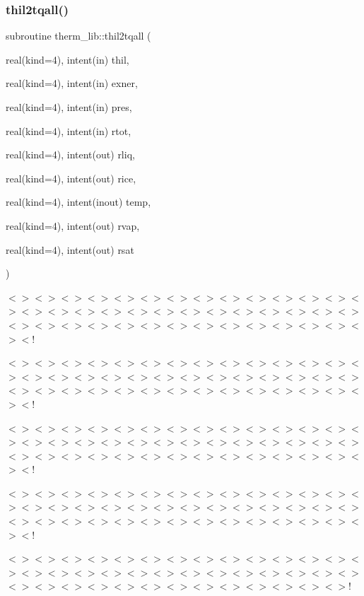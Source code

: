 \subsubsection{\texorpdfstring{thil2tqall()}{thil2tqall()}}
{\footnotesize\ttfamily subroutine therm\+\_\+lib\+::thil2tqall (\begin{DoxyParamCaption}\item[{real(kind=4), intent(in)}]{thil,  }\item[{real(kind=4), intent(in)}]{exner,  }\item[{real(kind=4), intent(in)}]{pres,  }\item[{real(kind=4), intent(in)}]{rtot,  }\item[{real(kind=4), intent(out)}]{rliq,  }\item[{real(kind=4), intent(out)}]{rice,  }\item[{real(kind=4), intent(inout)}]{temp,  }\item[{real(kind=4), intent(out)}]{rvap,  }\item[{real(kind=4), intent(out)}]{rsat }\end{DoxyParamCaption})}

$<$$>$$<$$>$$<$$>$$<$$>$$<$$>$$<$$>$$<$$>$$<$$>$$<$$>$$<$$>$$<$$>$$<$$>$$<$$>$$<$$>$$<$$>$$<$$>$$<$$>$$<$$>$$<$$>$$<$$>$$<$$>$$<$$>$$<$$>$$<$$>$$<$$>$$<$$>$$<$$>$$<$$>$$<$$>$$<$$>$$<$$>$$<$$>$$<$$>$$<$$>$$<$$>$$<$$>$$<$$>$$<$$>$$<$$>$$<$$>$$<$$>$$<$!

$<$$>$$<$$>$$<$$>$$<$$>$$<$$>$$<$$>$$<$$>$$<$$>$$<$$>$$<$$>$$<$$>$$<$$>$$<$$>$$<$$>$$<$$>$$<$$>$$<$$>$$<$$>$$<$$>$$<$$>$$<$$>$$<$$>$$<$$>$$<$$>$$<$$>$$<$$>$$<$$>$$<$$>$$<$$>$$<$$>$$<$$>$$<$$>$$<$$>$$<$$>$$<$$>$$<$$>$$<$$>$$<$$>$$<$$>$$<$$>$$<$$>$$<$!

$<$$>$$<$$>$$<$$>$$<$$>$$<$$>$$<$$>$$<$$>$$<$$>$$<$$>$$<$$>$$<$$>$$<$$>$$<$$>$$<$$>$$<$$>$$<$$>$$<$$>$$<$$>$$<$$>$$<$$>$$<$$>$$<$$>$$<$$>$$<$$>$$<$$>$$<$$>$$<$$>$$<$$>$$<$$>$$<$$>$$<$$>$$<$$>$$<$$>$$<$$>$$<$$>$$<$$>$$<$$>$$<$$>$$<$$>$$<$$>$$<$$>$$<$!

$<$$>$$<$$>$$<$$>$$<$$>$$<$$>$$<$$>$$<$$>$$<$$>$$<$$>$$<$$>$$<$$>$$<$$>$$<$$>$$<$$>$$<$$>$$<$$>$$<$$>$$<$$>$$<$$>$$<$$>$$<$$>$$<$$>$$<$$>$$<$$>$$<$$>$$<$$>$$<$$>$$<$$>$$<$$>$$<$$>$$<$$>$$<$$>$$<$$>$$<$$>$$<$$>$$<$$>$$<$$>$$<$$>$$<$$>$$<$$>$$<$$>$$<$!

$<$$>$$<$$>$$<$$>$$<$$>$$<$$>$$<$$>$$<$$>$$<$$>$$<$$>$$<$$>$$<$$>$$<$$>$$<$$>$$<$$>$$<$$>$$<$$>$$<$$>$$<$$>$$<$$>$$<$$>$$<$$>$$<$$>$$<$$>$$<$$>$$<$$>$$<$$>$$<$$>$$<$$>$$<$$>$$<$$>$$<$$>$$<$$>$$<$$>$$<$$>$$<$$>$$<$$>$$<$$>$$<$$>$$<$$>$$<$$>$!

